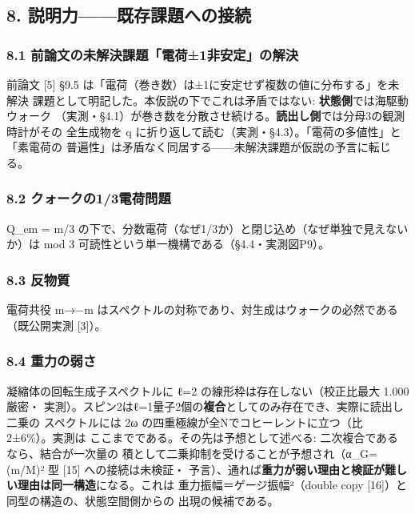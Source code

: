\documentclass[
]{ltjarticle}
\begin{document}
\subsection{8.
説明力------既存課題への接続}\label{ux8aacux660eux529bux65e2ux5b58ux8ab2ux984cux3078ux306eux63a5ux7d9a}

\subsubsection{8.1
前論文の未解決課題「電荷±1非安定」の解決}\label{ux524dux8ad6ux6587ux306eux672aux89e3ux6c7aux8ab2ux984cux96fbux83771ux975eux5b89ux5b9aux306eux89e3ux6c7a}

前論文 {[}5{]} §9.5
は「電荷（巻き数）は±1に安定せず複数の値に分布する」を未解決
課題として明記した。本仮説の下でこれは矛盾ではない:
\textbf{状態側}では海駆動ウォーク
（実測・§4.1）が巻き数を分散させ続ける。\textbf{読出し側}では分母3の観測時計がその
全生成物を \textbar q
に折り返して読む（実測・§4.3）。「電荷の多値性」と「素電荷の
普遍性」は矛盾なく同居する------未解決課題が仮説の予言に転じる。

\subsubsection{8.2
クォークの1/3電荷問題}\label{ux30afux30a9ux30fcux30afux306e13ux96fbux8377ux554fux984c}

Q\_em = m/3
の下で、分数電荷（なぜ1/3か）と閉じ込め（なぜ単独で見えないか）は mod 3
可読性という単一機構である（§4.4・実測図P9）。

\subsubsection{8.3 反物質}\label{ux53cdux7269ux8cea}

電荷共役 m→−m はスペクトルの対称であり、対生成はウォークの必然である
（既公開実測 {[}3{]}）。

\subsubsection{8.4 重力の弱さ}\label{ux91cdux529bux306eux5f31ux3055}

凝縮体の回転生成子スペクトルに ℓ=2 の線形枠は存在しない（校正比最大
1.000 厳密・
実測）。スピン2はℓ=1量子2個の\textbf{複合}としてのみ存在でき、実際に読出し二乗の
スペクトルには 2ω の四重極線が全Nでコヒーレントに立つ（比
2±6\%）。実測は ここまでである。その先は予想として述べる:
二次複合であるなら、結合が一次量の
積として二乗抑制を受けることが予想され（α\_G=(m/M)² 型 {[}15{]}
への接続は未検証・
予言）、通れば\textbf{重力が弱い理由と検証が難しい理由は同一構造}になる。これは
重力振幅＝ゲージ振幅²（double copy
{[}16{]}）と同型の構造の、状態空間側からの 出現の候補である。
\end{document}
